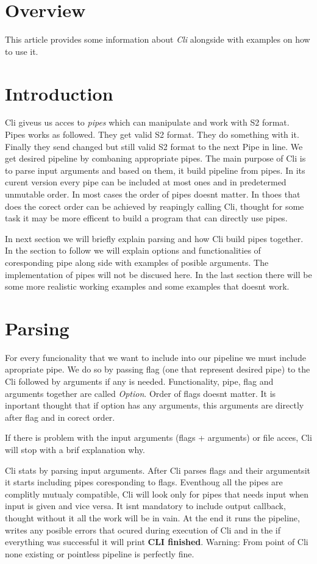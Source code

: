 \documentclass[english]{article}
\begin{document}
\section{Overview}

This article provides some information about \textit{Cli} alongside with examples on how to use it.

\section{Introduction}

Cli giveus us acces to \textit{pipes} which can manipulate and work with S2 format. Pipes works as followed. They get valid S2 format. They do something with it. Finally they send changed but still valid S2 format to the next Pipe in line. We get desired pipeline by combaning appropriate pipes.
The main purpose of Cli is to parse input arguments and based on them, it build pipeline from pipes. In its curent version every pipe can be included at most ones and in predetermed unmutable order. In most cases the order of pipes doesnt matter. In thoes that does the corect order can be achieved by reapingly calling Cli, thought for some task it may be more efficent to build a program that can directly use pipes.

In next section we will briefly explain parsing and how Cli build pipes together.
In the section to follow we will explain options and functionalities of coresponding pipe along side with examples of posible arguments. The implementation of pipes will not be discused here.
In the last section there will be some more realistic working examples and some examples that doesnt work. 

\section{Parsing}
For every funcionality that we want to include into our pipeline we must include apropriate pipe. We do so by passing flag (one that represent desired pipe) to the Cli followed by arguments if any is needed. Functionality, pipe, flag and arguments together are called \textit{Option}. Order of flags doesnt matter. It is inportant thought that if option has any arguments, this arguments are directly after flag and in corect order. 

If there is problem with the input arguments (flags + arguments) or file acces, Cli will stop with a brif explanation why.

Cli stats by parsing input arguments.
After Cli parses flags and their argumentsit it starts including pipes coresponding to flags. Eventhoug all the pipes are complitly mutualy compatible, Cli will look only for pipes that needs input when input is given and vice versa. It isnt mandatory to include output callback, thought without it all the work will be in vain. At the end it runs the pipeline, writes any posible errors that ocured during execution of Cli and in the if everything was successful it will print \textbf{CLI finished}.
Warning: From point of Cli none existing or pointless pipeline is perfectly fine.
\end{document}
